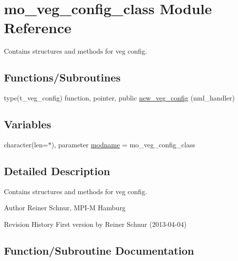 \hypertarget{namespacemo__veg__config__class}{}\section{mo\+\_\+veg\+\_\+config\+\_\+class Module Reference}
\label{namespacemo__veg__config__class}


Contains structures and methods for veg config.  


\subsection*{Functions/\+Subroutines}
\begin{DoxyCompactItemize}
\item 
type(t\+\_\+veg\+\_\+config) function, pointer, public \hyperlink{namespacemo__veg__config__class_ad45bc88a338969c3c20ca8780a84747e}{new\+\_\+veg\+\_\+config} (nml\+\_\+handler)
\end{DoxyCompactItemize}
\subsection*{Variables}
\begin{DoxyCompactItemize}
\item 
character(len=$\ast$), parameter \hyperlink{namespacemo__veg__config__class_afd31198fa2009910db770d611d528ee5}{modname} = \textquotesingle{}mo\+\_\+veg\+\_\+config\+\_\+class\textquotesingle{}
\end{DoxyCompactItemize}


\subsection{Detailed Description}
Contains structures and methods for veg config. 

\begin{DoxyAuthor}{Author}
Reiner Schnur, M\+P\+I-\/\+M Hamburg
\end{DoxyAuthor}
\begin{DoxyParagraph}{Revision History}
First version by Reiner Schnur (2013-\/04-\/04) 
\end{DoxyParagraph}


\subsection{Function/\+Subroutine Documentation}
\hypertarget{namespacemo__veg__config__class_ad45bc88a338969c3c20ca8780a84747e}{}
